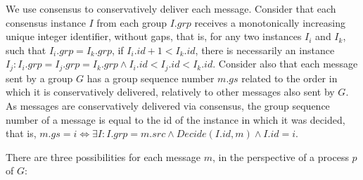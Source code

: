 \documentclass[times, 10pt]{article}
\begin{document}
We use consensus to conservatively deliver each message. Consider that each consensus instance $I$ from each group $I.grp$ receives a monotonically increasing unique integer identifier, without gaps, that is, for any two instances $I_i$ and $I_k$, such that $I_i.grp = I_k.grp$, if $I_i.id + 1 < I_k.id$, there is necessarily an instance $I_j : I_i.grp = I_j.grp = I_k.grp \wedge I_i.id < I_j.id < I_k.id$. Consider also that each message sent by a group $G$ has a group sequence number $m.gs$ related to the order in which it is conservatively delivered, relatively to other messages also sent by $G$. As messages are conservatively delivered via consensus, the group sequence number of a message is equal to the id of the instance in which it was decided, that is, $m.gs = i \Leftrightarrow \exists I : I.grp = m.src \wedge Decide(I.id, m) \wedge I.id = i$.

There are three possibilities for each message $m$, in the perspective of a process $p$ of $G$:
\end{document}

